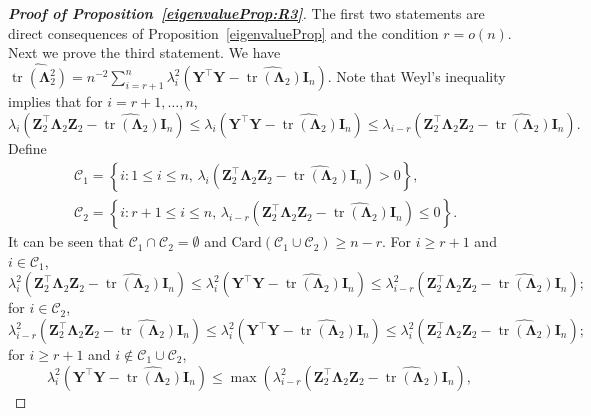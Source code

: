 \documentclass[10pt]{book}
\theoremstyle{definition}
\DeclareMathOperator{\mytr}{tr}
\newcommand{\bZ}{\mathbf{Z}}
\newcommand{\bY}{\mathbf{Y}}
\newcommand{\bI}{\mathbf{I}}
\newcommand{\bfsym}[1]{\ensuremath{\boldsymbol{#1}}}
\def\bLambda {\bfsym {\Lambda}}
\begin{document}
\begin{proof}[\textbf{Proof of Proposition~\ref{eigenvalueProp:R3}}]
    The first two statements are direct consequences of Proposition~\ref{eigenvalueProp} and the condition $r=o(n)$.
    Next we prove the third statement.
    We have
        $
        \widehat{\mytr(\bLambda_2^2)}
        =
        n^{-2}\sum_{i=r+1}^n \lambda_i^2(\bY^\top \bY-\widehat{\mytr(\bLambda_2)}\bI_n)
        $.
        Note that Weyl's inequality implies that for $i=r+1,\ldots,n$,
        \begin{equation*}
            \lambda_{i}(\bZ_2^\top \bLambda_2 \bZ_2 - \widehat{\mytr(\bLambda_2)}\bI_n)
            \leq
            \lambda_i(\bY^\top \bY-\widehat{\mytr(\bLambda_2)}\bI_n)
            \leq
            \lambda_{i-r}(\bZ_2^\top \bLambda_2 \bZ_2 - \widehat{\mytr(\bLambda_2)}\bI_n).
        \end{equation*}
Define
\begin{align*}
&\mathcal{C}_1=
\left\{i:
    1\leq i\leq n,\, \lambda_i\left(\bZ_2^\top \bLambda_2 \bZ_2-\widehat{\mytr(\bLambda_2)}\bI_n\right)> 0
\right\},
\\
&\mathcal{C}_2=
\left\{i:
    r+1\leq i\leq n, \,
    \lambda_{i-r}\left(\bZ_2^\top \bLambda_2 \bZ_2-\widehat{\mytr(\bLambda_2)}\bI_n\right)\leq 0
\right\}.
\end{align*}
It can be seen that $\mathcal{C}_1\cap \mathcal{C}_2 =\emptyset$ and $\text{Card}(\mathcal{C}_1\cup\mathcal{C}_2) \geq n - r$.
For $i\geq r+1$ and $i\in \mathcal{C}_1$,
    \begin{equation*}
        \lambda_i^2(\bZ_2^\top \bLambda_2 \bZ_2-\widehat{\mytr(\bLambda_2)}\bI_n) \leq \lambda_i^2(\bY^\top \bY-\widehat{\mytr(\bLambda_2)}\bI_n)\leq \lambda_{i-r}^2(\bZ_2^\top \bLambda_2 \bZ_2-\widehat{\mytr(\bLambda_2)}\bI_n);
    \end{equation*}
for $i\in \mathcal{C}_2$,
    \begin{equation*}
        \lambda_{i-r}^2(\bZ_2^\top \bLambda_2 \bZ_2-\widehat{\mytr(\bLambda_2)}\bI_n) \leq \lambda_i^2(\bY^\top \bY-\widehat{\mytr(\bLambda_2)}\bI_n)\leq \lambda_{i}^2(\bZ_2^\top \bLambda_2 \bZ_2-\widehat{\mytr(\bLambda_2)}\bI_n);
    \end{equation*}
    for $i\geq r+1$ and $i\notin \mathcal{C}_1\cup \mathcal{C}_2$,
    \begin{equation*}
        \lambda_i^2(\bY^\top \bY-\widehat{\mytr(\bLambda_2)}\bI_n)\leq
        \max
        \left(
            \lambda_{i-r}^2(\bZ_2^\top \bLambda_2 \bZ_2-\widehat{\mytr(\bLambda_2)}\bI_n) 
        ,

\end{equation*}
\end{proof}
\end{document}
